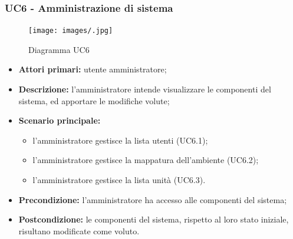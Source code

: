 \subsubsection{UC6 - Amministrazione di sistema}
	\begin{center}
		\begin{figure}[h!]
			\texttt{[image: images/.jpg]}
			\caption{Diagramma UC6}
		\end{figure}
	\end{center}
	\begin{itemize}
		\item \textbf{Attori primari:} utente amministratore;
		\item \textbf{Descrizione:} l'amministratore intende visualizzare le componenti del sistema, ed apportare le modifiche volute;
		\item \textbf{Scenario principale:} 
			\begin{itemize}
				\item l'amministratore gestisce la lista utenti (UC6.1);
				\item l'amministratore gestisce la mappatura dell'ambiente (UC6.2);
				\item l'amministratore gestisce la lista unità (UC6.3).
			\end{itemize}
		\item \textbf{Precondizione:} l'amministratore ha accesso alle componenti del sistema;
		\item \textbf{Postcondizione:} le componenti del sistema, rispetto al loro stato iniziale, risultano modificate come voluto.
	\end{itemize}
	
